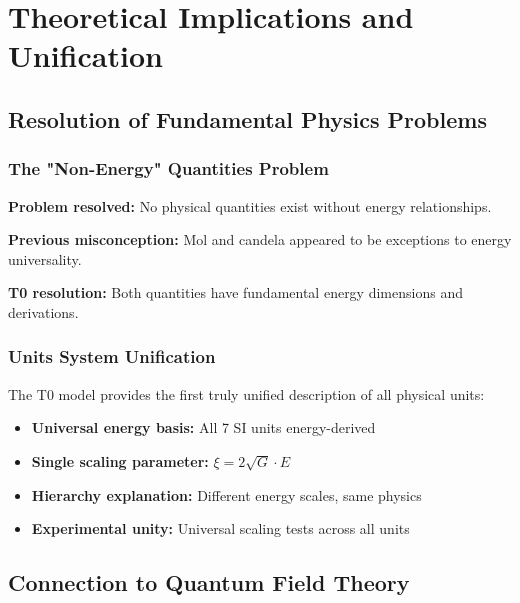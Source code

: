 \documentclass[12pt,a4paper]{article}
\newcommand{\xipar}{\xi}
\begin{document}
	\section{Theoretical Implications and Unification}
	\label{sec:theoretical_implications}
	
	\subsection{Resolution of Fundamental Physics Problems}
	\label{subsec:resolution_fundamental_problems}
	
	\subsubsection{The "Non-Energy" Quantities Problem}
	\label{subsubsec:non_energy_problem_resolved}
	
	\textbf{Problem resolved:} No physical quantities exist without energy relationships.
	
	\textbf{Previous misconception:} Mol and candela appeared to be exceptions to energy universality.
	
	\textbf{T0 resolution:} Both quantities have fundamental energy dimensions and derivations.
	
	\subsubsection{Units System Unification}
	\label{subsubsec:units_system_unification}
	
	The T0 model provides the first truly unified description of all physical units:
	
	\begin{itemize}
		\item \textbf{Universal energy basis:} All 7 SI units energy-derived
		\item \textbf{Single scaling parameter:} $\xipar = 2\sqrt{G} \cdot E$
		\item \textbf{Hierarchy explanation:} Different energy scales, same physics
		\item \textbf{Experimental unity:} Universal scaling tests across all units
	\end{itemize}
	
	\subsection{Connection to Quantum Field Theory}
	\label{subsec:qft_connection}
	
\end{document}
